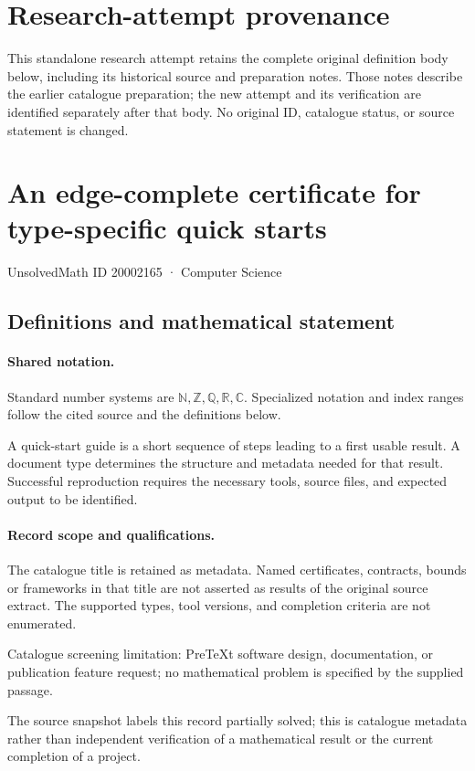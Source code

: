 \documentclass[11pt]{article}
\begin{document}
\section*{Research-attempt provenance}
This standalone research attempt retains the complete original definition body below,
including its historical source and preparation notes. Those notes describe the
earlier catalogue preparation; the new attempt and its verification are identified
separately after that body. No original ID, catalogue status, or source statement is changed.

\section{An edge-complete certificate for type-specific quick starts}\label{20002165}
{\small UnsolvedMath ID 20002165 · Computer Science}
\subsection{Definitions and mathematical statement}

\paragraph{Shared notation.}Standard number systems are $\mathbb N,\mathbb Z,\mathbb Q,\mathbb R,\mathbb C$. Specialized notation and index ranges follow the cited source and the definitions below.


A quick-start guide is a short sequence of steps leading to a first usable result. A document type determines the structure and metadata needed for that result. Successful reproduction requires the necessary tools, source files, and expected output to be identified.
\paragraph{Record scope and qualifications.}
The catalogue title is retained as metadata. Named certificates, contracts, bounds or frameworks in that title are not asserted as results of the original source extract.
The supported types, tool versions, and completion criteria are not enumerated.

Catalogue screening limitation: PreTeXt software design, documentation, or publication feature request; no mathematical problem is specified by the supplied passage.

The source snapshot labels this record partially solved; this is catalogue metadata rather than independent verification of a mathematical result or the current completion of a project.
\end{document}
